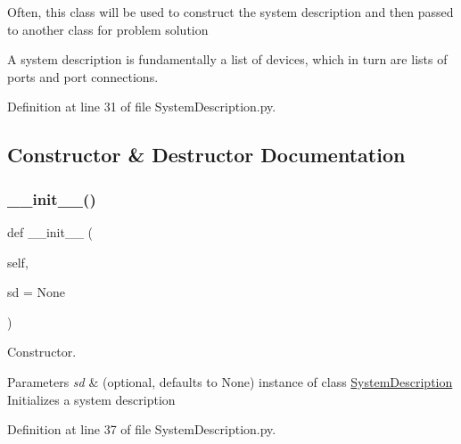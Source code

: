 Often, this class will be used to construct the system description and then passed to another class for problem solution

A system description is fundamentally a list of devices, which in turn are lists of ports and port connections. 

Definition at line 31 of file System\+Description.\+py.



\subsection{Constructor \& Destructor Documentation}
\mbox{\label{classSignalIntegrity_1_1SystemDescriptions_1_1SystemDescription_1_1SystemDescription_a2fa2ae61a4511a760e2d2047ec07eb05}} 
\subsubsection{\texorpdfstring{\+\_\+\+\_\+init\+\_\+\+\_\+()}{\_\_init\_\_()}}
{\footnotesize\ttfamily def \+\_\+\+\_\+init\+\_\+\+\_\+ (\begin{DoxyParamCaption}\item[{}]{self,  }\item[{}]{sd = {\ttfamily None} }\end{DoxyParamCaption})}



Constructor. 


\begin{DoxyParams}{Parameters}
{\em sd} & (optional, defaults to None) instance of class \hyperlink{classSignalIntegrity_1_1SystemDescriptions_1_1SystemDescription_1_1SystemDescription}{System\+Description} Initializes a system description \\
\hline
\end{DoxyParams}


Definition at line 37 of file System\+Description.\+py.



